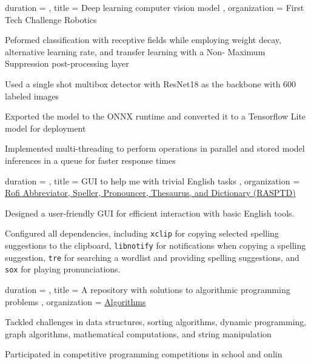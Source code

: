 \documentclass[sidebar-width=2.25in, primary=slate]{clean-resume}
\begin{document}
    \begin{experience}
      {
        duration = {  },
        title = { Deep learning computer vision model },
        organization = {First Tech Challenge Robotics}
      }
      \item Peformed classification with receptive fields while employing weight decay, alternative learning rate, and transfer learning with a Non-
      Maximum Suppression post-processing layer
      \item Used a single shot multibox detector with ResNet18 as the backbone with 600 labeled images
      \item Exported the model to the ONNX runtime and converted it to a Tensorflow Lite model for deployment
      \item Implemented multi-threading to perform operations in parallel and stored model inferences in a queue for faster response times
    \end{experience}

    \begin{experience}
      {
        duration = {  },
        title = { GUI to help me with trivial English tasks },
        organization = { \href{https://github.com/anishgoyal1108/RASPTD}{Rofi Abbreviator, Speller, Pronouncer, Thesaurus, and Dictionary (RASPTD)} }
      }
      \item Designed a user-friendly GUI for efficient interaction with basic English tools.
      \item Configured all dependencies, including \verb|xclip| for copying selected spelling suggestions to the clipboard, \verb|libnotify| for notifications when copying a spelling suggestion, \verb|tre| for searching a wordlist and providing spelling suggestions, and \verb|sox| for playing pronunciations.
    \end{experience}
    
    \begin{experience}
      {
        duration = {  },
        title = { A repository with solutions to algorithmic programming problems },
        organization = { \href{https://github.com/Yubo-Cao/algorithms}{Algorithms} }
      }
      \item Tackled challenges in data structures, sorting algorithms, dynamic programming, graph algorithms, mathematical computations, and string manipulation
      \item Participated in competitive programming competitions in school and onlin
    \end{experience}
\end{document}
